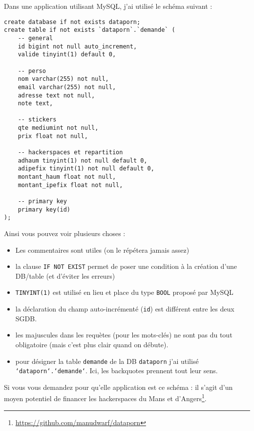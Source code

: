 \documentclass[a4paper, 11pt]{report}
\newcommand\http[1]{\footnote{\url{#1}}}
\begin{document}
Dans une application utilisant MySQL, j'ai utilisé le schéma suivant :

\begin{verbatim}
create database if not exists dataporn;
create table if not exists `dataporn`.`demande` (
    -- general
    id bigint not null auto_increment,
    valide tinyint(1) default 0,

    -- perso
    nom varchar(255) not null,
    email varchar(255) not null,
    adresse text not null,
    note text,

    -- stickers
    qte mediumint not null,
    prix float not null,

    -- hackerspaces et repartition
    adhaum tinyint(1) not null default 0,
    adipefix tinyint(1) not null default 0,
    montant_haum float not null,
    montant_ipefix float not null,

    -- primary key
    primary key(id)
);
\end{verbatim}

Ainsi vous pouvez voir plusieurs choses :

\begin{itemize}
    \item Les commentaires sont utiles (on le répétera jamais assez)
    \item la clause \texttt{IF NOT EXIST} permet de poser une condition à la création d'une DB/table (et d'éviter les
        erreurs)
    \item \texttt{TINYINT(1)} est utilisé en lieu et place du type \texttt{BOOL} proposé par MySQL
    \item la déclaration du champ auto-incrémenté (\texttt{id}) est différent entre les deux SGDB.
    \item les majuscules dans les requètes (pour les mots-clés) ne sont pas du tout obligatoire (mais c'est plus clair
        quand on débute).
    \item pour désigner la table \texttt{demande} de la DB \texttt{dataporn} j'ai utilisé \texttt{`dataporn`.`demande`}.
        Ici, les backquotes prennent tout leur sens.
\end{itemize}

Si vous vous demandez pour qu'elle application est ce schéma : il s'agit d'un moyen potentiel de financer les
hackerspaces du Mans et d'Angers\http{https://github.com/manudwarf/dataporn}.

\end{document}
